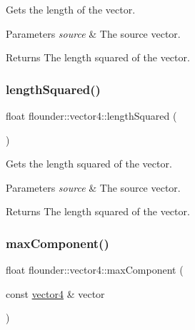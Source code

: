 Gets the length of the vector. 


\begin{DoxyParams}{Parameters}
{\em source} & The source vector. \\
\hline
\end{DoxyParams}
\begin{DoxyReturn}{Returns}
The length squared of the vector. 
\end{DoxyReturn}
\mbox{\label{classflounder_1_1vector4_a335e6cb17910722580079ff41bf352f1}} 
\subsubsection{\texorpdfstring{length\+Squared()}{lengthSquared()}\hspace{0.1cm}{\footnotesize\ttfamily [2/2]}}
{\footnotesize\ttfamily float flounder\+::vector4\+::length\+Squared (\begin{DoxyParamCaption}{ }\end{DoxyParamCaption})}



Gets the length squared of the vector. 


\begin{DoxyParams}{Parameters}
{\em source} & The source vector. \\
\hline
\end{DoxyParams}
\begin{DoxyReturn}{Returns}
The length squared of the vector. 
\end{DoxyReturn}
\mbox{\label{classflounder_1_1vector4_ae9825f135cc1cefd981779b7df9bf1f6}} 
\subsubsection{\texorpdfstring{max\+Component()}{maxComponent()}}
{\footnotesize\ttfamily float flounder\+::vector4\+::max\+Component (\begin{DoxyParamCaption}\item[{const \hyperlink{classflounder_1_1vector4}{vector4} \&}]{vector }\end{DoxyParamCaption})\hspace{0.3cm}{\ttfamily [static]}}



